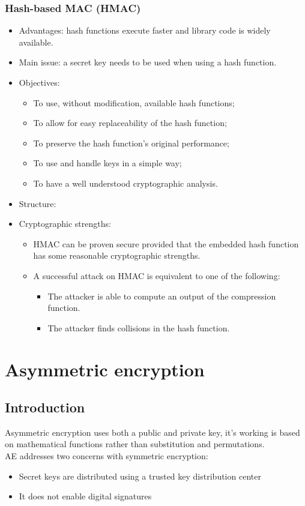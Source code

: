 \documentclass[12pt]{article}
\begin{document}
 \subsubsection{Hash-based MAC (HMAC)}
 \begin{itemize}
 	\item Advantages: hash functions execute faster and library code is widely available.
 	\item Main issue: a secret key needs to be used when using a hash function.
 	\item Objectives:
 	\begin{itemize}
 		\item To use, without modification, available hash functions;
 		\item To allow for easy replaceability of the hash function;
 		\item To preserve the hash function's original performance;
 		\item To use and handle keys in a simple way;
 		\item To have a well understood cryptographic analysis.
 	\end{itemize}
 	\item Structure: 
 	\item Cryptographic strengths:
 	\begin{itemize}
 		\item HMAC can be proven secure provided that the embedded hash function has some reasonable cryptographic strengths.
 		\item A successful attack on HMAC is equivalent to one of the following:
 		\begin{itemize}
 			\item The attacker is able to compute an output of the compression function.
 			\item The attacker finds collisions in the hash function.
 		\end{itemize}
 	\end{itemize}
 \end{itemize}

 
 \section{Asymmetric encryption}
 \subsection{Introduction}
 Asymmetric encryption uses both a public and private key, it's working is based on mathematical functions rather than substitution and permutations.\\
 AE addresses two concerns with symmetric encryption:
 \begin{itemize}
 	\item Secret keys are distributed using a trusted key distribution center
 	\item It does not enable digital signatures
 \end{itemize}
\end{document}
